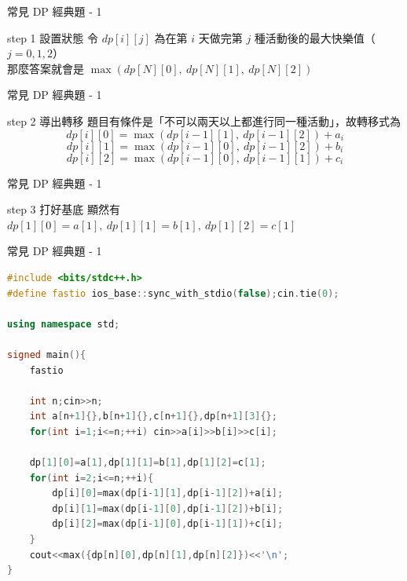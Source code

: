 \documentclass[aspectratio=169]{beamer}
\begin{document}
    \begin{frame}{常見 DP 經典題 - 1}
        \begin{alertblock}{step 1 設置狀態}
            令 $dp[i][j]$ 為在第 $i$ 天做完第 $j$ 種活動後的最大快樂值（$j = 0, 1, 2$） \\
            \vspace{2mm}
            那麼答案就會是 $\max(dp[N][0], \ dp[N][1], \ dp[N][2])$
        \end{alertblock}
    \end{frame}
    \begin{frame}{常見 DP 經典題 - 1}
        \begin{block}{step 2 導出轉移}
            題目有條件是「不可以兩天以上都進行同一種活動」，故轉移式為 \\
            $$dp[i][0] = \max(dp[i-1][1], \ dp[i-1][2]) + a_i$$
            $$dp[i][1] = \max(dp[i-1][0], \ dp[i-1][2]) + b_i$$
            $$dp[i][2] = \max(dp[i-1][0], \ dp[i-1][1]) + c_i$$
        \end{block}
    \end{frame}
     \begin{frame}{常見 DP 經典題 - 1}   
        \begin{block}{step 3 打好基底}
            顯然有 $dp[1][0] = a[1], \ dp[1][1] = b[1], \ dp[1][2] = c[1]$
        \end{block}
    \end{frame}

    \begin{frame}[fragile]{常見 DP 經典題 - 1}
        \begin{lstlisting}[language=C++, basicstyle=\ttfamily\tiny]
#include <bits/stdc++.h>
#define fastio ios_base::sync_with_stdio(false);cin.tie(0);

using namespace std;

signed main(){
    fastio

    int n;cin>>n;
    int a[n+1]{},b[n+1]{},c[n+1]{},dp[n+1][3]{};
    for(int i=1;i<=n;++i) cin>>a[i]>>b[i]>>c[i];
    
    dp[1][0]=a[1],dp[1][1]=b[1],dp[1][2]=c[1];
    for(int i=2;i<=n;++i){
        dp[i][0]=max(dp[i-1][1],dp[i-1][2])+a[i];
        dp[i][1]=max(dp[i-1][0],dp[i-1][2])+b[i];
        dp[i][2]=max(dp[i-1][0],dp[i-1][1])+c[i];
    }
    cout<<max({dp[n][0],dp[n][1],dp[n][2]})<<'\n';
}     
        \end{lstlisting}
    \end{frame}
    
\end{document}
